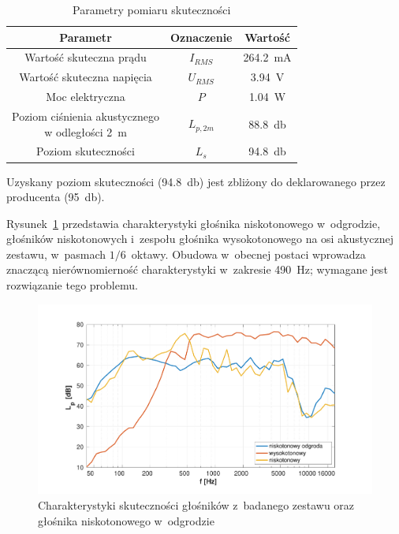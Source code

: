 \documentclass[12pt]{oska}
\begin{document}
		\begin{table}[!ht]
			\centering
			\caption{Parametry pomiaru skuteczności}
			\label{t:skutecznosc}
			\begin{tabular}{|c|c|c|}
				\hline
				\textbf{Parametr} & \textbf{Oznaczenie} & \textbf{Wartość} \\\hline
				Wartość skuteczna prądu & $I_{RMS}$ & \SI{264,2}{\milli\ampere} \\\hline
				Wartość skuteczna napięcia & $U_{RMS}$ & \SI{3,94}{\volt} \\\hline
				Moc elektryczna & $P$ & \SI{1,04}{\watt} \\\hline
				\makecell{Poziom ciśnienia akustycznego\\w odległości \SI{2}{\metre}} & $L_{p,2m}$ & \SI{88,8}{\decibel} \\\hline
				Poziom skuteczności & $L_{s}$ & \SI{94,8}{\decibel} \\\hline
			\end{tabular}
		\end{table}
		
		Uzyskany poziom skuteczności (\SI{94,8}{\decibel}) jest zbliżony do deklarowanego przez producenta (\SI{95}{\decibel}).
		
		Rysunek~\ref{r:skutecznosc} przedstawia charakterystyki głośnika niskotonowego w~odgrodzie, głośników niskotonowych i~zespołu głośnika wysokotonowego na osi akustycznej zestawu, w~pasmach $1/6$~oktawy. Obudowa w~obecnej postaci wprowadza znaczącą nierównomierność charakterystyki w~zakresie \SI{490}{\hertz}; wymagane jest rozwiązanie tego problemu.
		
		\begin{figure}[!ht]
			\centering
			\includegraphics[width=.8\textwidth,trim={2cm .5cm 2cm 1cm},clip]{skutecznosci_stolik.pdf}
			\caption{Charakterystyki skuteczności głośników z~badanego zestawu oraz głośnika niskotonowego w~odgrodzie}
			\label{r:skutecznosc}
		\end{figure}
		
\end{document}
